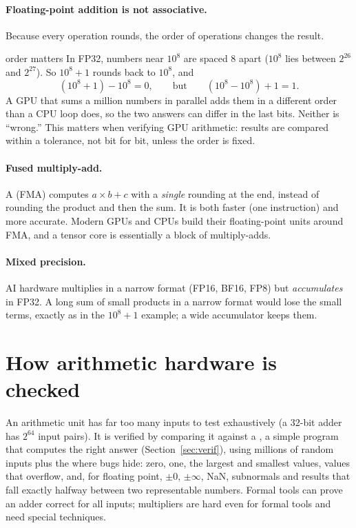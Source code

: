 \paragraph{Floating-point addition is not associative.} Because every operation rounds, the order of operations changes the result.

\begin{worked}{order matters}
In FP32, numbers near $10^8$ are spaced 8 apart ($10^8$ lies between $2^{26}$ and $2^{27}$). So $10^8 + 1$ rounds back to $10^8$, and
\[
  (10^8 + 1) - 10^8 = 0, \qquad\text{but}\qquad (10^8 - 10^8) + 1 = 1.
\]
A GPU that sums a million numbers in parallel adds them in a different order than a CPU loop does, so the two answers can differ in the last bits. Neither is ``wrong.'' This matters when verifying GPU arithmetic: results are compared within a tolerance, not bit for bit, unless the order is fixed.
\end{worked}

\paragraph{Fused multiply-add.} A  (FMA) computes $a \times b + c$ with a \emph{single} rounding at the end, instead of rounding the product and then the sum. It is both faster (one instruction) and more accurate. Modern GPUs and CPUs build their floating-point units around FMA, and a tensor core is essentially a block of multiply-adds.

\paragraph{Mixed precision.} AI hardware multiplies in a narrow format (FP16, BF16, FP8) but \emph{accumulates} in FP32. A long sum of small products in a narrow format would lose the small terms, exactly as in the $10^8 + 1$ example; a wide accumulator keeps them.

\section{How arithmetic hardware is checked}

An arithmetic unit has far too many inputs to test exhaustively (a 32-bit adder has $2^{64}$ input pairs). It is verified by comparing it against a , a simple program that computes the right answer (Section~\ref{sec:verif}), using millions of random inputs plus the  where bugs hide: zero, one, the largest and smallest values, values that overflow, and, for floating point, $\pm 0$, $\pm\infty$, NaN, subnormals and results that fall exactly halfway between two representable numbers. Formal tools can prove an adder correct for all inputs; multipliers are hard even for formal tools and need special techniques.

